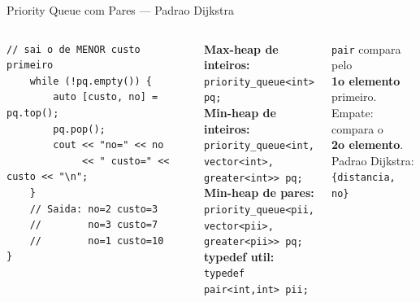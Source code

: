 \documentclass[aspectratio=169,11pt]{beamer}
\begin{document}
\begin{frame}[fragile,shrink=6]{Priority Queue com Pares --- Padrao Dijkstra}
\begin{columns}[t]
\begin{tcolorbox}[caixaCodigo]
\begin{lstlisting}[style=cppsmall]
    // sai o de MENOR custo primeiro
    while (!pq.empty()) {
        auto [custo, no] = pq.top();
        pq.pop();
        cout << "no=" << no
             << " custo=" << custo << "\n";
    }
    // Saida: no=2 custo=3
    //        no=3 custo=7
    //        no=1 custo=10
}
        \end{lstlisting}
      \end{tcolorbox}
      \vspace{0.1cm}
      \begin{tcolorbox}[caixaAzul,title={Declaracoes comuns}]
        \footnotesize
        \textbf{Max-heap de inteiros:}\\
        \texttt{priority\_queue<int> pq;}\\[6pt]
        \textbf{Min-heap de inteiros:}\\
        \texttt{priority\_queue<int,}\\
        \texttt{vector<int>,}\\
        \texttt{greater<int>> pq;}\\[6pt]
        \textbf{Min-heap de pares:}\\
        \texttt{priority\_queue<pii,}\\
        \texttt{vector<pii>,}\\
        \texttt{greater<pii>> pq;}\\[6pt]
        \textbf{typedef util:}\\
        \texttt{typedef pair<int,int> pii;}
      \end{tcolorbox}
      \vspace{0.15cm}
      \begin{tcolorbox}[caixaVerde,title={Comparacao de pares}]
        \footnotesize
        \texttt{pair} compara pelo\\
        \textbf{1o elemento} primeiro.\\
        Empate: compara o\\
        \textbf{2o elemento}.\\[3pt]
        Padrao Dijkstra:\\
        \texttt{\{distancia, no\}}
      \end{tcolorbox}
  \end{columns}
\end{frame}
\end{document}

